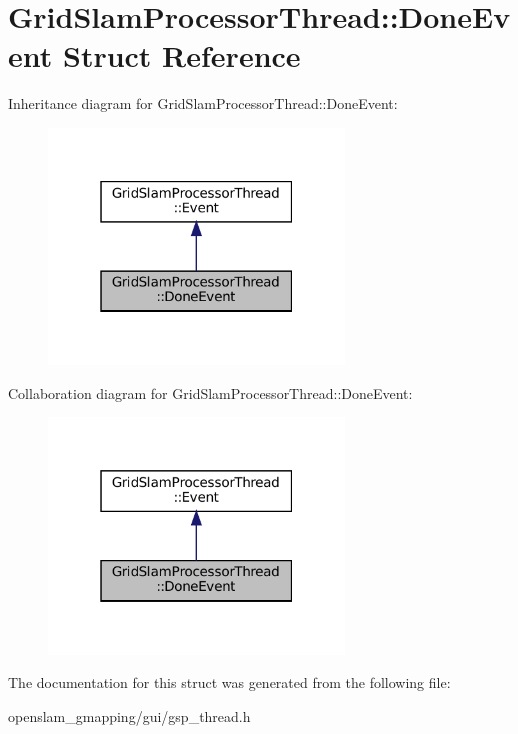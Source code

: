 \hypertarget{structGridSlamProcessorThread_1_1DoneEvent}{}\section{Grid\+Slam\+Processor\+Thread\+:\+:Done\+Event Struct Reference}
\label{structGridSlamProcessorThread_1_1DoneEvent}


Inheritance diagram for Grid\+Slam\+Processor\+Thread\+:\+:Done\+Event\+:
\nopagebreak
\begin{figure}[H]
\begin{center}
\leavevmode
\includegraphics[width=223pt]{structGridSlamProcessorThread_1_1DoneEvent__inherit__graph}
\end{center}
\end{figure}


Collaboration diagram for Grid\+Slam\+Processor\+Thread\+:\+:Done\+Event\+:
\nopagebreak
\begin{figure}[H]
\begin{center}
\leavevmode
\includegraphics[width=223pt]{structGridSlamProcessorThread_1_1DoneEvent__coll__graph}
\end{center}
\end{figure}


The documentation for this struct was generated from the following file\+:\begin{DoxyCompactItemize}
\item 
openslam\+\_\+gmapping/gui/gsp\+\_\+thread.\+h\end{DoxyCompactItemize}
